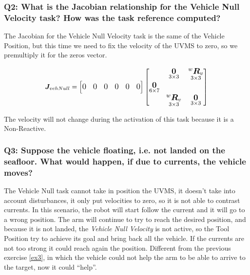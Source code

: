 \documentclass{article}
\newcommand{\ocio} {\marginpar{!}}
\begin{document}
\subsubsection{Q2: What is the Jacobian relationship for the Vehicle Null Velocity task? How was the task reference computed?}
The Jacobian for the Vehicle Null Velocity task is the same of the Vehicle Position, but this time we need to fix the velocity of the UVMS to zero, so we premultiply it for the zeros vector. %

\begin{equation}
\large
\boldsymbol{J}_{vehNull}=\begin{bmatrix} 0 & 0 & 0 & 0 & 0 & 0
\end{bmatrix}
    \begin{bmatrix}
     & \underset{3\times 3}{\boldsymbol{0}} & \underset{ 3\times 3}{^{w}\boldsymbol{R}_{v}} \\
     \underset{6\times 7}{\boldsymbol{0}} \\
     & \underset{ 3\times 3}{^{w}\boldsymbol{R}_{v}} & \underset{3\times 3}{\boldsymbol{0}} \\
    \end{bmatrix}
\end{equation}

The velocity will not change during the activation of this task because it is a Non-Reactive.

\subsubsection{Q3: Suppose the vehicle floating, i.e. not landed on the seafloor. What would happen, if due to currents, the vehicle moves?}
The Vehicle Null task cannot take in position the UVMS, it doesn't take into account disturbances, it only put velocities to zero, so it is not able to contrast currents. In this scenario, the robot will start follow the current and it will go to a wrong position. The arm will continue to try to reach the desired position, and because it is not landed, the \textit{Vehicle Null Velocity} is not active, so the Tool Position try to achieve its goal and bring back all the vehicle. If the currents are not too strong it could reach again the position. Different from the previous exercise \ref{ex3}, in which the vehicle could not help the arm to be able to arrive to the target, now it could ``help''. \ocio
\clearpage
\end{document}

